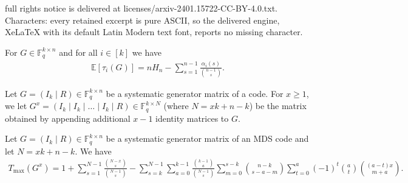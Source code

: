 \documentclass[10pt,a4paper]{amsart}
\newcommand{\E}{\mathbb{E}}
\newcommand{\F}{\mathbb{F}}
\newcommand{\tmax}{T_{\max}}
\begin{document}
full rights notice is delivered at licenses/arxiv-2401.15722-CC-BY-4.0.txt. Characters: every retained excerpt is pure ASCII, so the delivered engine, XeLaTeX with its default Latin Modern text font, reports no missing character.
\begin{lemma} \label{lem:fi}
For $G\in \F_q^{k \times n}$ and for all $i\in[k]$ we have
\begin{align*}
    \E[\tau_i(G)] =  n H_n - \sum_{s=1}^{n-1} \displaystyle \frac{\alpha_i(s)}{\binom{n-1}{s}}.
\end{align*}
\end{lemma}

\begin{notation} \label{not:extmds}
Let $G= (I_k \mid R) \in \F_q^{k \times n}$ be a systematic generator matrix of a code. For $x \ge 1$, we let $G^x = (I_k \mid I_k \mid \dots \mid I_k \mid R) \in \F_q^{k \times N}$ (where $N=xk+n-k$) be the matrix obtained by appending additional $x-1$ identity matrices to $G$. 
\end{notation}

\begin{theorem} \label{prop:extmds}
Let $G= (I_k \mid R) \in \F_q^{k \times n}$ be a systematic generator matrix of an MDS code and let $N=xk+n-k$. We have
\begin{align*}
\tmax(G^x) = 1+\sum_{s=1}^{N-1}\frac{\binom{N-x}{s}}{\binom{N-1}{s}} -\sum_{s=k}^{N-1}\sum_{a=0}^{k-1}\frac{\binom{k-1}{a}}{\binom{N-1}{s}} \sum_{m=0}^{s-k}\binom{n-k}{s-a-m}\sum_{t=0}^a(-1)^t\binom{a}{t}\binom{(a-t)x}{m+a}.
\end{align*}
\end{theorem}
\end{document}

